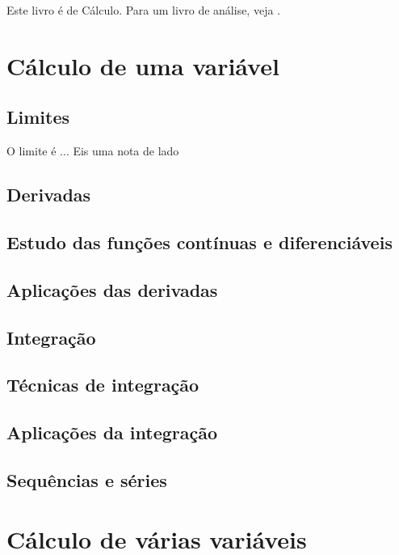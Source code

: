 \documentclass[symmetric,a4paper,justified]{tufte-book}
\begin{document}
Este livro é de Cálculo. Para um livro de análise, veja \cite{Rudin}.
\mainmatter

\part{Cálculo de uma variável}

\chapter{Limites}
O limite é ... Eis uma nota de lado
\chapter{Derivadas}

\chapter{Estudo das funções contínuas e diferenciáveis}

\chapter{Aplicações das derivadas}

\chapter{Integração}

\chapter{Técnicas de integração}

\chapter{Aplicações da integração}

\chapter{Sequências e séries} 


\part{Cálculo de várias variáveis}
\end{document}
